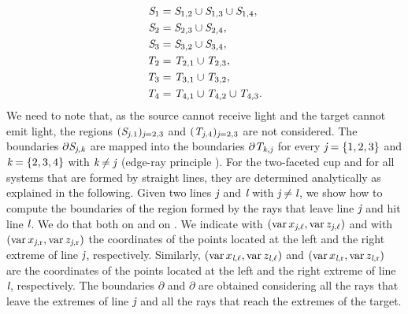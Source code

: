 \begin{equation}
\label{SPS}
\begin{split}
 \mbox{$\emph{S}_{\textit{$1$}}$} & = \mbox{$\emph{S}_{\textit{$1$,$2$}}$}\cup
 \mbox{$\emph{S}_{\textit{$1$,$3$}}$} \cup \mbox{$\emph{S}_{\textit{$1$,$4$}}$},\\
\mbox{$\emph{S}_{\textit{$2$}}$} & =  \mbox{$\emph{S}_{\textit{$2$,$3$}}$} \cup \mbox{$\emph{S}_{\textit{$2$,$4$}}$},\\
\mbox{$\emph{S}_{\textit{$3$}}$} & =  \mbox{$\emph{S}_{\textit{$3$,$2$}}$} \cup \mbox{$\emph{S}_{\textit{$3$,$4$}}$},\\
\mbox{$\emph{T}_{\textit{$2$}}$} & = \mbox{$\emph{T}_{\textit{$2$,$1$}}$} \cup \mbox{$\emph{T}_{\textit{$2$,$3$}}$},\\
\mbox{$\emph{T}_{\textit{$3$}}$} & = \mbox{$\emph{T}_{\textit{$3$,$1$}}$}\cup \mbox{$\emph{T}_{\textit{$3$,$2$}}$},\\
\mbox{$\emph{T}_{\textit{$4$}}$} & = \mbox{$\emph{T}_{\textit{$4$,$1$}}$}\cup \mbox{$\emph{T}_{\textit{$4$,$2$}}$}\cup
\mbox{$\emph{T}_{\textit{$4$,$3$}}$}.
\end{split}
 \end{equation}
We need to note that, as the source cannot receive light and the target cannot emit light,  the regions $(\mbox{$\emph{S}_{\textit{\textit{j},$1$}}$})_{\textit{j}=2,3}$ and $(\mbox{$\emph{T}_{\textit{\textit{j},$4$}}$})_{\textit{j}=2, 3}$ are not considered.
The boundaries $\partial \mbox{$\emph{S}_{\textit{\textit{j},\textit{k}}}$}$ are mapped into the boundaries $\partial \mbox{$\emph{T}_{\textit{\textit{k},\textit{j}}}$}$ for every $\textit{j}=\{1, 2, 3\}$ 
and $\textit{k}=\{2, 3,4\}$ with $\textit{k}\neq \textit{j}$ (edge-ray principle \cite{Ries}). For the two-faceted cup and for all systems that are formed by straight lines, they are determined analytically as explained in the following.
Given two lines $\textit{j}$ and $\textit{l}$
with $\textit{j}\neq \textit{l}$, we show how to compute the boundaries of the region formed by the rays that leave line $\textit{j}$ and hit line $\textit{l}$. We do that both on  and on .
We indicate with $(\operatorname{var}{x}_{\textit{j}, \ell}, \operatorname{var}{z}_{\textit{j}, \ell})$ and with $(\operatorname{var}{x}_{\textit{j}, \textrm{r}},\operatorname{var}{z}_{\textit{j}, \textrm{r}})$ the coordinates of the points located at the left and the right extreme of line $\textit{j}$, respectively.
Similarly, $(\operatorname{var}{x}_{\textit{l}, \ell}, \operatorname{var}{z}_{\textit{l}, \ell})$ and $(\operatorname{var}{x}_{\textit{l}, \textrm{r}},\operatorname{var}{z}_{\textit{l}, \textrm{r}})$ are the coordinates of the points located at the left and the right extreme of line $\textit{l}$, respectively.
The boundaries $\partial$ and $\partial$ are obtained considering all the rays that leave the extremes of line $\textit{j}$ 
and all the rays that reach the extremes of the target.
